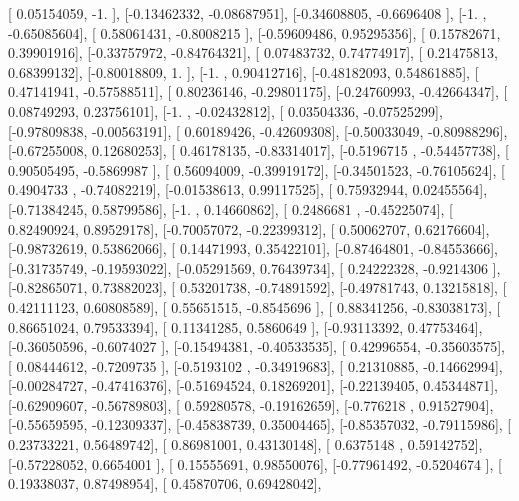 \documentclass{article}
\begin{document}
       [ 0.05154059, -1.        ],
       [-0.13462332, -0.08687951],
       [-0.34608805, -0.6696408 ],
       [-1.        , -0.65085604],
       [ 0.58061431, -0.8008215 ],
       [-0.59609486,  0.95295356],
       [ 0.15782671,  0.39901916],
       [-0.33757972, -0.84764321],
       [ 0.07483732,  0.74774917],
       [ 0.21475813,  0.68399132],
       [-0.80018809,  1.        ],
       [-1.        ,  0.90412716],
       [-0.48182093,  0.54861885],
       [ 0.47141941, -0.57588511],
       [ 0.80236146, -0.29801175],
       [-0.24760993, -0.42664347],
       [ 0.08749293,  0.23756101],
       [-1.        , -0.02432812],
       [ 0.03504336, -0.07525299],
       [-0.97809838, -0.00563191],
       [ 0.60189426, -0.42609308],
       [-0.50033049, -0.80988296],
       [-0.67255008,  0.12680253],
       [ 0.46178135, -0.83314017],
       [-0.5196715 , -0.54457738],
       [ 0.90505495, -0.5869987 ],
       [ 0.56094009, -0.39919172],
       [-0.34501523, -0.76105624],
       [ 0.4904733 , -0.74082219],
       [-0.01538613,  0.99117525],
       [ 0.75932944,  0.02455564],
       [-0.71384245,  0.58799586],
       [-1.        ,  0.14660862],
       [ 0.2486681 , -0.45225074],
       [ 0.82490924,  0.89529178],
       [-0.70057072, -0.22399312],
       [ 0.50062707,  0.62176604],
       [-0.98732619,  0.53862066],
       [ 0.14471993,  0.35422101],
       [-0.87464801, -0.84553666],
       [-0.31735749, -0.19593022],
       [-0.05291569,  0.76439734],
       [ 0.24222328, -0.9214306 ],
       [-0.82865071,  0.73882023],
       [ 0.53201738, -0.74891592],
       [-0.49781743,  0.13215818],
       [ 0.42111123,  0.60808589],
       [ 0.55651515, -0.8545696 ],
       [ 0.88341256, -0.83038173],
       [ 0.86651024,  0.79533394],
       [ 0.11341285,  0.5860649 ],
       [-0.93113392,  0.47753464],
       [-0.36050596, -0.6074027 ],
       [-0.15494381, -0.40533535],
       [ 0.42996554, -0.35603575],
       [ 0.08444612, -0.7209735 ],
       [-0.5193102 , -0.34919683],
       [ 0.21310885, -0.14662994],
       [-0.00284727, -0.47416376],
       [-0.51694524,  0.18269201],
       [-0.22139405,  0.45344871],
       [-0.62909607, -0.56789803],
       [ 0.59280578, -0.19162659],
       [-0.776218  ,  0.91527904],
       [-0.55659595, -0.12309337],
       [-0.45838739,  0.35004465],
       [-0.85357032, -0.79115986],
       [ 0.23733221,  0.56489742],
       [ 0.86981001,  0.43130148],
       [ 0.6375148 ,  0.59142752],
       [-0.57228052,  0.6654001 ],
       [ 0.15555691,  0.98550076],
       [-0.77961492, -0.5204674 ],
       [ 0.19338037,  0.87498954],
       [ 0.45870706,  0.69428042],
\end{document}
